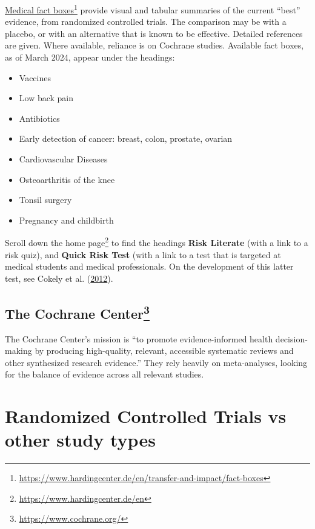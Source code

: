 \documentclass[
  10ptls,
  b5paper]{book}
\providecommand{\tightlist}{%
  \setlength{\itemsep}{0pt}\setlength{\parskip}{0pt}}
\begin{document}
\href{https://www.hardingcenter.de/en/transfer-and-impact/fact-boxes}{Medical fact
boxes}\footnote{\url{https://www.hardingcenter.de/en/transfer-and-impact/fact-boxes}}
provide visual and tabular summaries of the current ``best'' evidence,
from randomized controlled trials. The comparison may be with a placebo,
or with an alternative that is known to be effective. Detailed
references are given. Where available, reliance is on Cochrane studies.
Available fact boxes, as of March 2024, appear under the headings:

\begin{itemize}
\tightlist
\item
  Vaccines
\item
  Low back pain
\item
  Antibiotics
\item
  Early detection of cancer: breast, colon, prostate, ovarian
\item
  Cardiovascular Diseases
\item
  Osteoarthritis of the knee
\item
  Tonsil surgery
\item
  Pregnancy and childbirth
\end{itemize}

Scroll down the home page\footnote{\url{https://www.hardingcenter.de/en}} to find the headings \textbf{Risk
Literate} (with a link to a risk quiz), and \textbf{Quick Risk Test} (with a
link to a test that is targeted at medical students and medical
professionals. On the development of this latter test, see
Cokely et al. (\protect\hyperlink{ref-cokely2012measuring}{2012}).

\hypertarget{the-cochrane-center04-medical-4}{%
\subsection*{\texorpdfstring{The Cochrane Center\footnote{\url{https://www.cochrane.org/}}}{The Cochrane Center}}\label{the-cochrane-center04-medical-4}}

The Cochrane Center's mission is ``to promote evidence-informed health
decision-making by producing high-quality, relevant, accessible
systematic reviews and other synthesized research evidence.'' They rely
heavily on meta-analyses, looking for the balance of evidence across all
relevant studies.

\hypertarget{ss:rct}{%
\section{Randomized Controlled Trials vs other study types}\label{ss:rct}}
\end{document}
